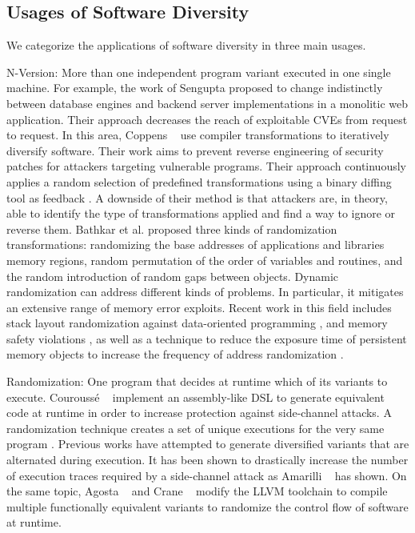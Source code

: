 \subsection*{Usages of Software Diversity}

We categorize the applications of software diversity in three main usages.

\begin{usage}{N-Version:}
    \label{usage:n-version}
    \normalfont
    More than one independent program variant executed in one single machine. For example, the work of Sengupta \etal \cite{10.5555/3091125.3091155} proposed to change indistinctly between database engines and backend server implementations in a monolitic web application. Their approach decreases the reach of exploitable CVEs from request to request. 
    In this area, Coppens \etal~\cite{coppens2013feedback} use compiler transformations to iteratively diversify software. Their work aims to prevent reverse engineering of security patches for attackers targeting vulnerable programs.
    Their approach continuously applies a random selection of predefined transformations using a binary diffing tool as feedback \citationneeded. 
    A downside of their method is that attackers are, in theory, able to identify the type of transformations applied and find a way to ignore or reverse them.
    Bathkar et al. \cite{bhatkar03,bhatkar2005efficient} proposed three kinds of randomization transformations: randomizing the base addresses of applications and libraries  memory regions, random permutation of the order of variables and routines, and the random introduction of random gaps between objects. 
    Dynamic randomization can address different kinds of problems. In particular, it mitigates an extensive range of memory error exploits. 
    Recent work in this field includes stack layout randomization against data-oriented programming \cite{aga2019smokestack}, and memory safety violations \cite{lee2021savior}, as well as a technique to reduce the exposure time of persistent memory objects to increase the frequency of address randomization \cite{xu2020merr}.
\end{usage}


\begin{usage}{Randomization:}
    \label{usage:randomization}
    \normalfont
    One program that decides at runtime which of its variants to execute. Courouss{\'e} \etal~\cite{courousse2016runtime} implement an assembly-like DSL to generate equivalent code at runtime in order to increase protection against side-channel attacks. 
    A randomization technique creates a set of unique executions for the very same program \cite{bhatkar03}. 
    Previous works have attempted to generate diversified variants that are alternated during execution.
    It has been shown to drastically increase the number of execution traces required by a side-channel attack as
    Amarilli \etal~\cite{amarilli2011can} has shown. On the same topic,
    Agosta \etal~\cite{agosta2015meet} and Crane \etal~\cite{crane2015thwarting}
    modify the LLVM toolchain to compile multiple functionally equivalent variants to randomize the control flow of software at runtime.
\end{usage}

